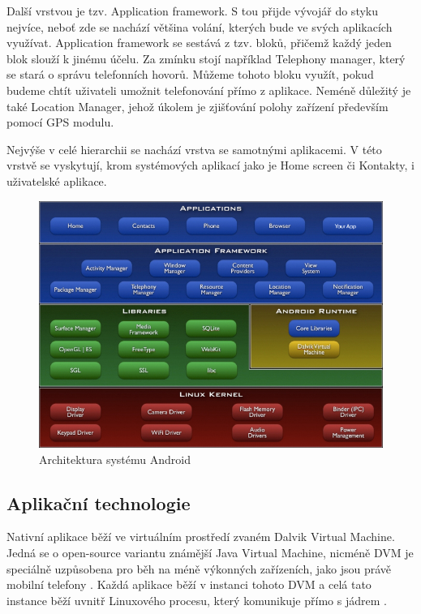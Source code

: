 Další vrstvou je tzv. Application framework. S tou přijde vývojář do styku nejvíce, neboť zde se nachází většina volání, kterých bude ve svých aplikacích využívat. Application framework se sestává z tzv. bloků, přičemž každý jeden blok slouží k jinému účelu. Za zmínku stojí například Telephony manager, který se stará o správu telefonních hovorů. Můžeme tohoto bloku využít, pokud budeme chtít uživateli umožnit telefonování přímo z aplikace. Neméně důležitý je také Location Manager, jehož úkolem je zjišťování polohy zařízení především pomocí GPS modulu.

Nejvýše v celé hierarchii se nachází vrstva se samotnými aplikacemi. V této vrstvě se vyskytují, krom systémových aplikací jako je Home screen či Kontakty, i uživatelské aplikace.

\begin{figure}\centering
\includegraphics[width=1.0\textwidth]{Android-architecture.jpg}
\caption{Architektura systému Android \cite{android_architecture}}
\label{fig:AndroidArchitecture}
\end{figure}

\subsection{Aplikační technologie}
Nativní aplikace běží ve virtuálním prostředí zvaném Dalvik Virtual Machine. Jedná se o open-source variantu známější Java Virtual Machine, nicméně DVM je speciálně uzpůsobena pro běh na méně výkonných zařízeních, jako jsou právě mobilní telefony \cite{android_architecture}. Každá aplikace běží v instanci tohoto DVM a celá tato instance běží uvnitř Linuxového procesu, který komunikuje přímo s jádrem \cite{introduction_android_development}.

